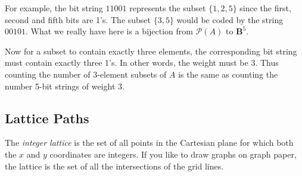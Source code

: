 \documentclass[10pt,]{book}
\theoremstyle{plain}
\theoremstyle{definition}
\theoremstyle{definition}
\theoremstyle{definition}
\numberwithin{equation}{section}
\def\B{\mathbf{B}}
\def\pow{\mathcal P}
\begin{document}
        For example, the bit string \(11001\) represents the subset \(\{1,2,5\}\) since the first, second and fifth bits are 1's. The subset \(\{3,5\}\) would be coded by the string \(00101\). What we really have here is a bijection from \(\pow(A)\) to \(\B^5\).
\par

        Now for a subset to contain exactly three elements, the corresponding bit string must contain exactly three 1's. In other words, the weight must be 3. Thus counting the number of 3-element subsets of \(A\) is the same as counting the number 5-bit strings of weight 3.
\typeout{************************************************}
\typeout{************************************************}
\subsection[ Lattice Paths]{ Lattice Paths}\label{subsection-14}

        The \emph{integer lattice} is the set of all points in the Cartesian plane for which both the \(x\) and \(y\) coordinates are integers. If you like to draw graphs on graph paper, the lattice is the set of all the intersections of the grid lines.
\par
\end{document}
